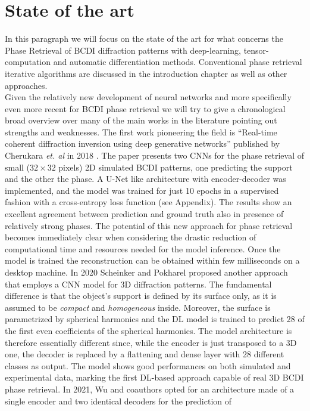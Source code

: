 \section{State of the art}\label{chp:phasing_stateart}
In this paragraph we will focus on the state of the art for what concerns the Phase Retrieval of BCDI diffraction patterns with
deep-learning, tensor-computation and automatic differentiation methods. Conventional phase retrieval iterative algorithms 
are discussed in the introduction chapter as well as other approaches. \\
Given the relatively new development of neural networks and more specifically even more recent for BCDI phase retrieval we will try
to give a chronological broad overview over many of the main works in the literature pointing out strengths and weaknesses.
The first work pioneering the field is ``Real-time coherent diffraction inversion using deep generative networks'' published
by Cherukara \textit{et. al} in 2018 \cite{cherukara_real-time_2018}. The paper presents two CNNs for the phase retrieval of small ($32\times32$ pixels) 2D 
simulated BCDI patterns, one predicting the support and the other the phase. A U-Net like architecture with 
encoder-decoder was implemented, and the model was trained for just 10 epochs in a supervised fashion with a cross-entropy loss function (see Appendix).
The results show an excellent agreement between prediction and ground truth also in presence of relatively strong phases. 
The potential of this new approach for phase retrieval becomes immediately clear when considering the drastic reduction of
computational time and resources needed for the model inference. Once the model is trained the reconstruction can be obtained
within few milliseconds on a desktop machine. In 2020 Scheinker and Pokharel proposed another approach \cite{scheinker_adaptive_2020}
that employs a CNN model for 3D diffraction patterns. The fundamental difference is that the object's support is defined 
by its surface only, as it is assumed to be \textit{compact} and \textit{homogeneous} inside. Moreover, the surface is
parametrized by spherical harmonics and the DL model is trained to predict 28 of the first even coefficients of the spherical
harmonics. The model architecture is therefore essentially different since, while the encoder is just transposed to a 3D 
one, the decoder is replaced by a flattening and dense layer with 28 different classes as output. The model shows good performances
on both simulated and experimental data, marking the first DL-based approach capable of real 3D BCDI phase retrieval.
In 2021, Wu and coauthors opted for an architecture made of a single encoder and two identical decoders for the prediction of 


